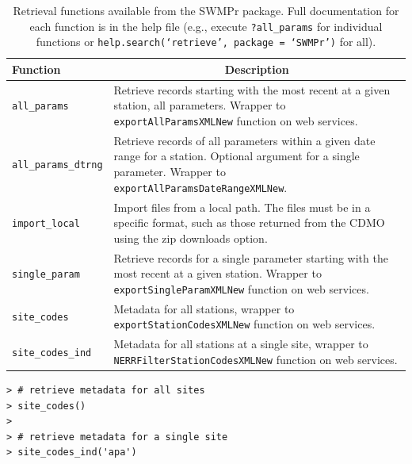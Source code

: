 \documentclass[10pt,letterpaper]{article}\usepackage[]{graphicx}\usepackage[]{color}
\makeatletter
\newenvironment{kframe}{%
 \def\at@end@of@kframe{}%
 \ifinner\ifhmode%
  \def\at@end@of@kframe{\end{minipage}}%
  \begin{minipage}{\columnwidth}%
 \fi\fi%
 \def\FrameCommand##1{\hskip\@totalleftmargin \hskip-\fboxsep
 \colorbox{shadecolor}{##1}\hskip-\fboxsep
     \hskip-\linewidth \hskip-\@totalleftmargin \hskip\columnwidth}%
 \MakeFramed {\advance\hsize-\width
   \@totalleftmargin\z@ \linewidth\hsize
   \@setminipage}}%
 {\par\unskip\endMakeFramed%
 \at@end@of@kframe}
\newenvironment{knitrout}{}{} %
\makeatother
\begin{document}
\begin{table}[!tbp]
\caption{Retrieval functions available from the SWMPr package. Full documentation for each function is in the help file (e.g., execute \texttt{?all\_params} for individual functions or \texttt{help.search(`retrieve', package = `SWMPr')} for all).\label{tab:retrieve}} 
\begin{center}
\begin{tabular}{lp{3.5in}}
\hline\hline
\multicolumn{1}{l}{Function}&\multicolumn{1}{c}{Description}\tabularnewline
\hline
\texttt{all\_params}&Retrieve records starting with the most recent at a given station, all parameters.  Wrapper to \texttt{exportAllParamsXMLNew} function on web services.\tabularnewline
\texttt{all\_params\_dtrng}&Retrieve records of all parameters within a given date range for a station.  Optional argument for a single parameter. Wrapper to \texttt{exportAllParamsDateRangeXMLNew}.\tabularnewline
\texttt{import\_local}&Import files from a local path.  The files must be in a specific format, such as those returned from the \gls{CDMO} using the zip downloads option.\tabularnewline
\texttt{single\_param}&Retrieve records for a single parameter starting with the most recent at a given station.  Wrapper to \texttt{exportSingleParamXMLNew} function on web services.\tabularnewline
\texttt{site\_codes}&Metadata for all stations, wrapper to \texttt{exportStationCodesXMLNew} function on web services.\tabularnewline
\texttt{site\_codes\_ind}&Metadata for all stations at a single site, wrapper  to \texttt{NERRFilterStationCodesXMLNew} function on web services.\tabularnewline
\hline
\end{tabular}\end{center}

\end{table}


\begin{knitrout}\small
{}\color{fgcolor}\begin{kframe}
\begin{verbatim}
> # retrieve metadata for all sites
> site_codes()
> 
> # retrieve metadata for a single site
> site_codes_ind('apa')
\end{verbatim}
\end{kframe}
\end{knitrout}
\end{document}
